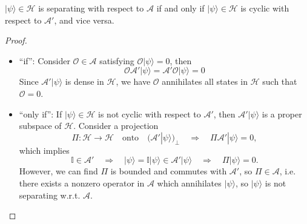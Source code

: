 \documentclass[10pt,a4paper]{amsart}
\def\A{\mathcal{A}}
\def\H{\mathcal{H}}
\def\O{\mathcal{O}}
\newcommand{\ket}[1]{| #1 \rangle } %
\begin{document}
\begin{thm}\label{thm:cs}
	$\ket{\psi}\in\H$ is separating with respect to $\A$ if and only if $\ket{\psi}\in\H$ is cyclic with respect to $\A'$, and vice versa.
\end{thm}

\begin{proof}
	\begin{itemize}
		\item ``if'': Consider $\O\in\A$ satisfying $\O\ket{\psi}=0$, then 
		\begin{equation}
			\O\A'\ket{\psi}=\A'\O\ket{\psi}=0
		\end{equation}
		Since $\A'\ket{\psi}$ is dense in $\H$, we have $\O$ annihilates all states in $\H$ such that $\O=0$.
		
		
		\item ``only if'': If $\ket{\psi}\in\H$ is not cyclic with respect to $\A'$, then $\A'\ket{\psi}$ is a proper subspace of $\H$. Consider a projection 
		\begin{equation}
			\Pi:\H\rightarrow\H \quad \text{onto}\quad (\A'\ket{\psi})_{\perp}\quad \Rightarrow \quad \Pi\A'\ket{\psi}=0,
		\end{equation}
		which implies
		\begin{equation}
			\mathbb{I}\in \A'\quad \Rightarrow \quad \ket{\psi}=\mathbb{I}\ket{\psi}\in \A'\ket{\psi}\quad \Rightarrow \quad \Pi\ket{\psi}=0.
		\end{equation}
		However, we can find $\Pi$ is bounded and commutes with $\A'$, so $\Pi\in\A$, i.e. there exists a nonzero operator in $\A$ which annihilates $\ket{\psi}$, so $\ket{\psi}$ is not separating w.r.t. $\A$.
	\end{itemize}
	
\end{proof}
\end{document}
